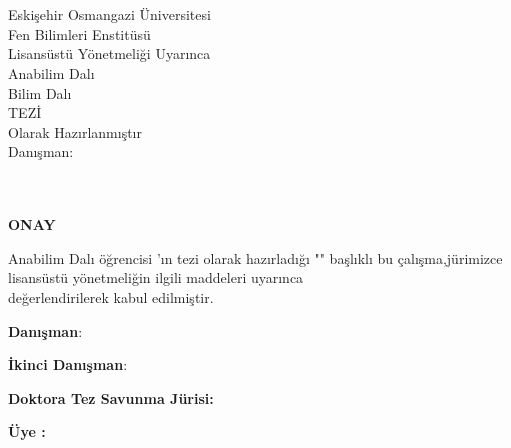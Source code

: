 \documentclass[]{esogu}			%
\begin{document}
\begin{titlingpage*}
\begin{center}
\vspace*{10mm}
\tbaslik\\								%
\vspace{12pc}							%
\yazar	\\								%
\vspace{8pc}							%
Eskişehir Osmangazi Üniversitesi\\		
Fen Bilimleri Enstitüsü\\
Lisansüstü Yönetmeliği Uyarınca\\
\bolum \space Anabilim Dalı\\
\bilim \space Bilim Dalı\\
\unvan \space TEZİ\\
Olarak Hazırlanmıştır\\
\vspace{7pc}
Danışman:\space \danisman\\			
\vfill	
\proje\\ 								%
\vspace{1pc}
\teslim\\
\vspace{2cm}
\end{center}

\end{titlingpage*}
\normalsize

\thispagestyle{empty}
\begin{center}
\large
\textbf{ONAY} 
\normalsize
\end{center}

\bolum \space Anabilim Dalı \unvan \space öğrencisi \yazar'ın \space \unvan\space tezi olarak hazırladığı "\textbf{\tbaslik}" başlıklı bu çalışma,\space jürimizce lisansüstü yönetmeliğin ilgili maddeleri uyarınca \\değerlendirilerek kabul edilmiştir.
\vspace{15mm}

\noindent \textbf{Danışman}\space\space\space\space\space\space\space\space:\space \danisman 

\noindent \textbf{İkinci Danışman}\space:\space \ikidanisman
\newline

\noindent \textbf{Doktora Tez Savunma Jürisi:}

\noindent \textbf{Üye :\space}\jbir
\end{document}
